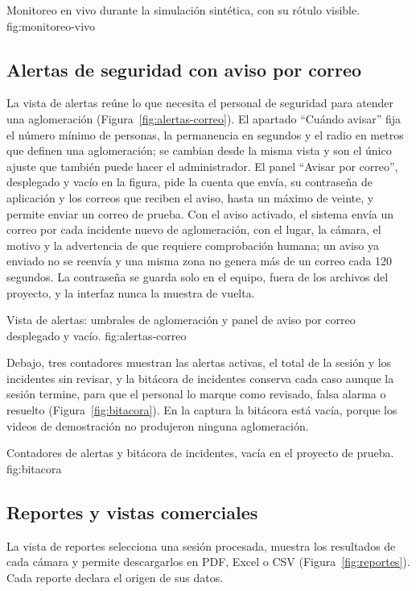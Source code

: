   {Monitoreo en vivo durante la simulación sintética, con su rótulo visible.}
  {fig:monitoreo-vivo}

\subsection{Alertas de seguridad con aviso por correo}
\label{subsec:diseno-alertas}

La vista de alertas reúne lo que necesita el personal de seguridad para atender una
aglomeración (Figura~\ref{fig:alertas-correo}). El apartado \enquote{Cuándo avisar} fija el
número mínimo de personas, la permanencia en segundos y el radio en metros que definen una
aglomeración; se cambian desde la misma vista y son el único ajuste que también puede hacer el
administrador. El panel \enquote{Avisar por correo}, desplegado y vacío en la figura, pide la
cuenta que envía, su contraseña de aplicación y los correos que reciben el aviso, hasta un
máximo de veinte, y permite enviar un correo de prueba. Con el aviso activado, el sistema envía
un correo por cada incidente nuevo de aglomeración, con el lugar, la cámara, el motivo y la
advertencia de que requiere comprobación humana; un aviso ya enviado no se reenvía y una
misma zona no genera más de un correo cada 120 segundos. La contraseña se guarda solo en el
equipo, fuera de los archivos del proyecto, y la interfaz nunca la muestra de vuelta.

  {Vista de alertas: umbrales de aglomeración y panel de aviso por correo desplegado y vacío.}
  {fig:alertas-correo}

Debajo, tres contadores muestran las alertas activas, el total de la sesión y los incidentes sin
revisar, y la bitácora de incidentes conserva cada caso aunque la sesión termine, para que el
personal lo marque como revisado, falsa alarma o resuelto (Figura~\ref{fig:bitacora}). En la
captura la bitácora está vacía, porque los videos de demostración no produjeron ninguna
aglomeración.

  {Contadores de alertas y bitácora de incidentes, vacía en el proyecto de prueba.}
  {fig:bitacora}

\subsection{Reportes y vistas comerciales}
\label{subsec:diseno-reportes}

La vista de reportes selecciona una sesión procesada, muestra los resultados de cada cámara y
permite descargarlos en PDF, Excel o CSV (Figura~\ref{fig:reportes}). Cada reporte declara el
origen de sus datos.

